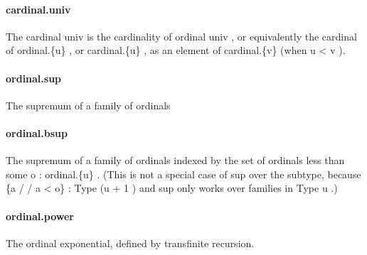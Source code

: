 \documentclass{article}
\begin{document}
\paragraph{cardinal.univ}
\par
The cardinal 
\colorbox[RGB]{253,246,227}{{{{\color[RGB]{101, 123, 131} univ }}}} is the cardinality of ordinal 
\colorbox[RGB]{253,246,227}{{{{\color[RGB]{101, 123, 131} univ }}}}, or
equivalently the cardinal of 
\colorbox[RGB]{253,246,227}{{{{\color[RGB]{101, 123, 131} ordinal.\{u\} }}}}, or 
\colorbox[RGB]{253,246,227}{{{{\color[RGB]{101, 123, 131} cardinal.\{u\} }}}},
as an element of 
\colorbox[RGB]{253,246,227}{{{{\color[RGB]{101, 123, 131} cardinal.\{v\} }}}} (when 
\colorbox[RGB]{253,246,227}{{{{\color[RGB]{101, 123, 131} u  }}}{{{\color[RGB]{181, 137, 0} < }}}{{{\color[RGB]{101, 123, 131}  v }}}}).
\paragraph{ordinal.sup}
\par
The supremum of a family of ordinals
\paragraph{ordinal.bsup}
\par
The supremum of a family of ordinals indexed by the set
of ordinals less than some 
\colorbox[RGB]{253,246,227}{{{{\color[RGB]{101, 123, 131} o : ordinal.\{u\} }}}}.
(This is not a special case of 
\colorbox[RGB]{253,246,227}{{{{\color[RGB]{101, 123, 131} sup }}}} over the subtype,
because 
\colorbox[RGB]{253,246,227}{{{{\color[RGB]{101, 123, 131} \{a  }}}{{{\color[RGB]{181, 137, 0} / }}}{{{\color[RGB]{181, 137, 0} / }}}{{{\color[RGB]{101, 123, 131}  a  }}}{{{\color[RGB]{181, 137, 0} < }}}{{{\color[RGB]{101, 123, 131}  o\} :  }}}{{{\color[RGB]{38, 139, 210} Type }}}{{{\color[RGB]{101, 123, 131}  (u }}}{{{\color[RGB]{181, 137, 0} + }}}{{{\color[RGB]{108, 113, 196} 1 }}}{{{\color[RGB]{101, 123, 131} ) }}}} and 
\colorbox[RGB]{253,246,227}{{{{\color[RGB]{101, 123, 131} sup }}}} only works over
families in 
\colorbox[RGB]{253,246,227}{{{{\color[RGB]{38, 139, 210} Type }}}{{{\color[RGB]{101, 123, 131}  u }}}}.)
\paragraph{ordinal.power}
\par
The ordinal exponential, defined by transfinite recursion.
\end{document}

